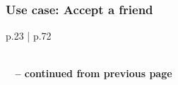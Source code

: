\documentclass[11pt,a4paper]{report}
\begin{document}
\subsubsection{Use case: Accept a friend}

\begin{longtable}{p{} | p{}}
    \caption{Use case: Accept a friend} \label{tab:ucAcceptFriend} \\
    \endfirsthead
        {{\bfseries \tablename\ \thetable{} -- continued from previous page}} \\
         \\
    \endhead
         \\ 
    \endfoot
    \endlastfoot
    

\end{longtable}
\end{document}
